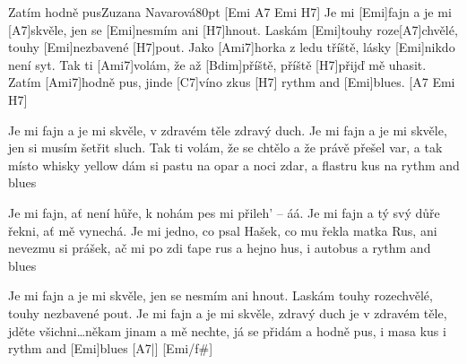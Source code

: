 \begin{song}{Zatím hodně pus}{Zuzana Navarová}{80pt}
[Emi A7 Emi H7]{}
%
Je mi [Emi]fajn a je mi [A7]skvěle, jen se [Emi]nesmím ani [H7]hnout.
Laskám [Emi]touhy roze[A7]chvělé, touhy [Emi]nezbavené [H7]pout.
Jako [Ami7]horka z ledu tříště, lásky [Emi]nikdo není syt.
Tak ti [Ami7]volám, že až [Bdim]příště, příště [H7]přijď mě uhasit.
Zatím [Ami7]hodně pus, jinde [C7]víno zkus [H7]{}
rythm and [Emi]blues. [A7 Emi H7]{}

%
Je mi fajn a je mi skvěle, v zdravém těle zdravý duch.
Je mi fajn a je mi skvěle, jen si musím šetřit sluch.
Tak ti volám, že se chtělo a že právě přešel var,
a tak místo whisky yellow dám si pastu na opar
a noci zdar, a flastru kus
na rythm and blues

%
Je mi fajn, ať není hůře, k nohám pes mi přileh' -- áá.
Je mi fajn a tý svý důře řekni, ať mě vynechá.
Je mi jedno, co psal Hašek, co mu řekla matka Rus,
ani nevezmu si prášek, ač mi po zdi ťape rus
a hejno hus, i autobus
a rythm and blues

%
Je mi fajn a je mi skvěle, jen se nesmím ani hnout.
Laskám touhy rozechvělé, touhy nezbavené pout.
Je mi fajn a je mi skvěle, zdravý duch je v zdravém těle,
jděte všichni\dots někam jinam a mě nechte, já se přidám
a hodně pus, i masa kus
\rl i rythm and [Emi]blues [A7|]{} [Emi/f#]{}

\end{song}
\vfil
\hfil{}
